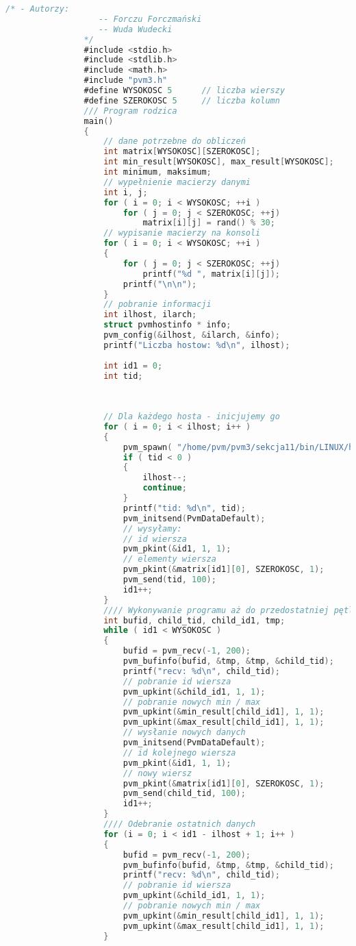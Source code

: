 			\begin{lstlisting}[language={C}]
				/* - Autorzy:
				   -- Forczu Forczmański
				   -- Wuda Wudecki
				*/
				#include <stdio.h>
				#include <stdlib.h>
				#include <math.h>
				#include "pvm3.h"
				#define WYSOKOSC 5		// liczba wierszy
				#define SZEROKOSC 5		// liczba kolumn
				/// Program rodzica
				main()
				{
					// dane potrzebne do obliczeń
					int matrix[WYSOKOSC][SZEROKOSC];
					int min_result[WYSOKOSC], max_result[WYSOKOSC];
					int minimum, maksimum;
					// wypełnienie macierzy danymi
					int i, j;
					for ( i = 0; i < WYSOKOSC; ++i )
						for ( j = 0; j < SZEROKOSC; ++j)
							matrix[i][j] = rand() % 30;
					// wypisanie macierzy na konsoli
					for ( i = 0; i < WYSOKOSC; ++i )
					{
						for ( j = 0; j < SZEROKOSC; ++j)
							printf("%d ", matrix[i][j]);
						printf("\n\n");
					}
					// pobranie informacji
					int ilhost, ilarch;
					struct pvmhostinfo * info;
					pvm_config(&ilhost, &ilarch, &info);
					printf("Liczba hostow: %d\n", ilhost);
					
					int id1 = 0;
					int tid;
					
					
					
					// Dla każdego hosta - inicjujemy go
					for ( i = 0; i < ilhost; i++ )
					{
						pvm_spawn( "/home/pvm/pvm3/sekcja11/bin/LINUX/hello_other", 0, PvmTaskHost, info[i].hi_name, 1, &tid);
						if ( tid < 0 )
						{
							ilhost--;
							continue;
						}
						printf("tid: %d\n", tid);
						pvm_initsend(PvmDataDefault);
						// wysyłamy:
						// id wiersza
						pvm_pkint(&id1, 1, 1);
						// elementy wiersza
						pvm_pkint(&matrix[id1][0], SZEROKOSC, 1);
						pvm_send(tid, 100);
						id1++;
					}
					//// Wykonywanie programu aż do przedostatniej pętli
					int bufid, child_tid, child_id1, tmp;
					while ( id1 < WYSOKOSC )
					{
						bufid = pvm_recv(-1, 200);
						pvm_bufinfo(bufid, &tmp, &tmp, &child_tid);
						printf("recv: %d\n", child_tid);
						// pobranie id wiersza
						pvm_upkint(&child_id1, 1, 1);
						// pobranie nowych min / max
						pvm_upkint(&min_result[child_id1], 1, 1);
						pvm_upkint(&max_result[child_id1], 1, 1);
						// wysłanie nowych danych
						pvm_initsend(PvmDataDefault);
						// id kolejnego wiersza
						pvm_pkint(&id1, 1, 1);
						// nowy wiersz
						pvm_pkint(&matrix[id1][0], SZEROKOSC, 1);
						pvm_send(child_tid, 100);
						id1++;
					}
					//// Odebranie ostatnich danych
					for	(i = 0; i < id1 - ilhost + 1; i++ )
					{
						bufid = pvm_recv(-1, 200);
						pvm_bufinfo(bufid, &tmp, &tmp, &child_tid);
						printf("recv: %d\n", child_tid);
						// pobranie id wiersza
						pvm_upkint(&child_id1, 1, 1);
						// pobranie nowych min / max
						pvm_upkint(&min_result[child_id1], 1, 1);
						pvm_upkint(&max_result[child_id1], 1, 1);
					}
					

\end{lstlisting}
